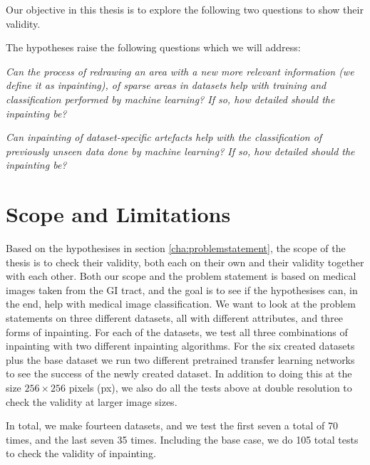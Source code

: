 Our objective in this thesis is to explore the following two questions to show their validity.

The hypotheses raise the following questions which we will address:\\

\begin{que} \label{que:a}
\noindent \textit{Can the process of redrawing an area with a new more relevant information (we define it as inpainting), of sparse areas in datasets help with training and classification performed by machine learning? If so, how detailed should the inpainting be?}\\
\end{que}

\begin{que} \label{que:b}
\noindent \textit{Can inpainting of dataset-specific artefacts help with the classification of previously unseen data done by machine learning? If so, how detailed should the inpainting be?}
\end{que}

\section{Scope and Limitations}
Based on the hypothesises in section \ref{cha:problemstatement}, the scope of the thesis is to check their validity, both each on their own and their validity together with each other. 
Both our scope and the problem statement is based on medical images taken from the GI tract, and the goal is to see if the hypothesises can, in the end, help with medical image classification.
We want to look at the problem statements on three different datasets, all with different attributes, and three forms of inpainting.
For each of the datasets, we test all three combinations of inpainting with two different inpainting algorithms. 
For the six created datasets plus the base dataset we run two different pretrained transfer learning networks to see the success of the newly created dataset.
In addition to doing this at the size $256 \times 256$ pixels (px), we also do all the tests above at double resolution to check the validity at larger image sizes.

In total, we make fourteen datasets, and we test the first seven a total of 70 times, and the last seven 35 times. Including the base case, we do 105 total tests to check the validity of inpainting.


